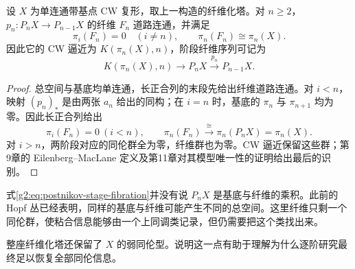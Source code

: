 \begin{proposition}\label{g2:prop:postnikov-stage-fiber}
	设 \(X\) 为单连通带基点 CW 复形，取上一构造的纤维化塔。对 \(n\ge2\)，\(p_n:P_nX\to P_{n-1}X\) 的纤维 \(F_n\) 道路连通，并满足
	\[
		\pi_i(F_n)=0\quad(i\ne n),\qquad \pi_n(F_n)\cong\pi_n(X).
	\]
	因此它的 CW 逼近为 \(K(\pi_n(X),n)\)，阶段纤维序列可记为
	\begin{equation}\label{g2:eq:postnikov-stage-fibration}
		K(\pi_n(X),n)\longrightarrow P_nX\xrightarrow{p_n}P_{n-1}X.
	\end{equation}
\end{proposition}
\begin{proof}
	总空间与基底均单连通，长正合列的末段先给出纤维道路连通。对 \(i<n\)，映射 \((p_n)_*\) 是由两张 \(a_n\) 给出的同构；在 \(i=n\) 时，基底的 \(\pi_n\) 与 \(\pi_{n+1}\) 均为零。因此长正合列给出
	\[
		\pi_i(F_n)=0\ (i<n),\qquad \pi_n(F_n)\xrightarrow{\cong}\pi_n(P_nX)=\pi_n(X).
	\]
	对 \(i>n\)，两阶段对应的同伦群全为零，纤维群也为零。CW 逼近保留这些群；第9章的 Eilenberg–MacLane 定义及第11章对其模型唯一性的证明给出最后的识别。
\end{proof}

式\eqref{g2:eq:postnikov-stage-fibration}并没有说 \(P_nX\) 是基底与纤维的乘积。此前的 Hopf 丛已经表明，同样的基底与纤维可能产生不同的总空间。这里纤维只剩一个同伦群，使粘合信息能够由一个上同调类记录，但仍需要把这个类找出来。

\ProseParagraphBreak

整座纤维化塔还保留了 \(X\) 的弱同伦型。说明这一点有助于理解为什么逐阶研究最终足以恢复全部同伦信息。

